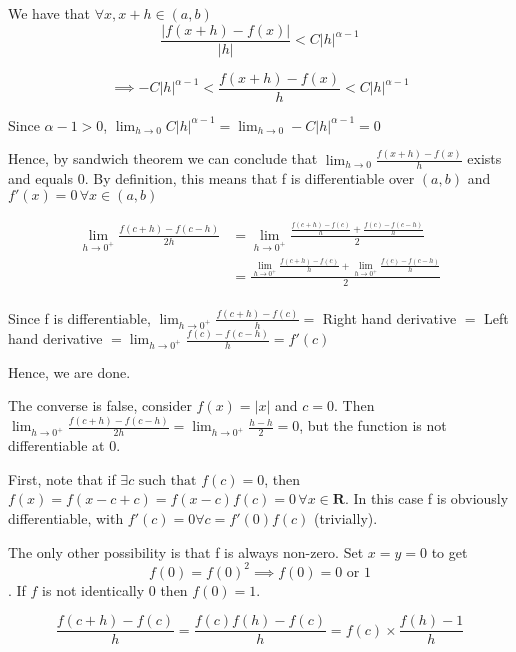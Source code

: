 \documentclass{article}
\begin{document}
        \item We have that $\forall x,x+h \in (a,b)$
                $$\frac{|f(x+h) - f(x)|}{|h|} < C |h|^{\alpha-1}$$

                $$\implies -C|h|^{\alpha-1} < \frac{f(x+h) - f(x)}{h} < C |h|^{\alpha-1}$$

                Since $\alpha -1 > 0$, $\lim_{h \to 0} C|h|^{\alpha-1} = \lim_{h \to 0} -C|h|^{\alpha-1} = 0$

                Hence, by sandwich theorem we can conclude that $\lim_{h\to 0}\frac{f(x+h) - f(x)}{h}$ exists and equals $0$. By definition, this means that f is differentiable over $(a, b)$ and $f'(x) = 0 \, \forall x \in (a,b)$

        \item

                \begin{align*}\lim_{h\to 0^+} \frac{f(c+h) - f(c-h)}{2h} &= \lim_{h\to 0^+}\frac{\frac{f(c+h)-f(c)}{h} + \frac{f(c) - f(c-h)}{h}}{2}\\ 
                                                                       &= \frac{\lim_{h\to 0^+}\frac{f(c+h)-f(c)}{h} + \lim_{h\to 0^+}\frac{f(c) - f(c-h)}{h}}{2}\\
                \end{align*}
               
                Since f is differentiable, $\lim_{h\to 0^+}\frac{f(c+h)-f(c)}{h} = $ Right hand derivative $ = $ Left hand derivative $ = \lim_{h\to 0^+}\frac{f(c) - f(c-h)}{h} = f'(c)$

                Hence, we are done.

                The converse is false, consider $f(x) = |x|$ and $c = 0$. Then $\lim_{h\to 0^+} \frac{f(c+h) - f(c-h)}{2h} = \lim_{h\to 0^+}\frac{h - h}{2} = 0$, but the function is not differentiable at 0.
        \item First, note that if $\exists c  \text{ such that } f(c) = 0$, then $f(x) = f(x-c+c) =f(x-c)f(c) = 0\, \forall x \in \mathbf{R}$. In this case f is obviously differentiable, with $f'(c) = 0 \forall c = f'(0)f(c)$ (trivially).

                The only other possibility is that f is always non-zero. Set $x=y=0$ to get
                $$f(0) = f(0)^2 \implies f(0) = 0 \text{ or } 1$$.
                If $f$ is not identically $0$ then $f(0) = 1$.

                $$\frac{f(c+h)-f(c)}{h} = \frac{f(c)f(h) - f(c)}{h} = f(c)\times \frac{f(h) - 1}{h}$$
\end{document}

